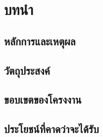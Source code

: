 \chapter{บทนำ}
\section{หลักการและเหตุผล}
\BlankBody
\section{วัตถุประสงค์}
\BlankBody
\section{ขอบเขตของโครงงาน}
\BlankBody
\section{ประโยชน์ที่คาดว่าจะได้รับ}
\BlankBody

